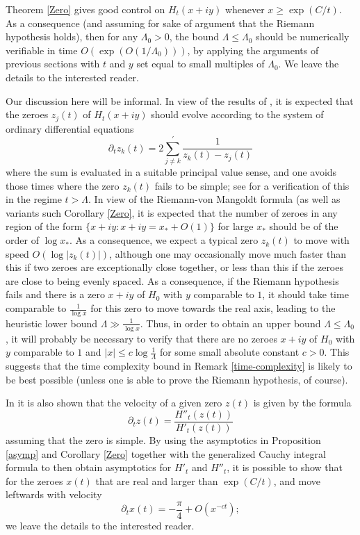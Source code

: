 \begin{remark}\label{time-complexity}  Theorem \ref{Zero} gives good control on $H_t(x+iy)$ whenever $x \geq \exp( C/t )$.  As a consequence (and assuming for sake of argument that the Riemann hypothesis holds), then for any $\Lambda_0 > 0$, the bound $\Lambda \leq \Lambda_0$ should be numerically verifiable in time $O( \exp( O(1/\Lambda_0) ))$, by applying the arguments of previous sections with $t$ and $y$ set equal to small multiples of $\Lambda_0$.  We leave the details to the interested reader.
\end{remark}

\begin{remark} Our discussion here will be informal.  In view of the results of \cite{csv}, it is expected that the zeroes $z_j(t)$ of $H_t(x+iy)$ should evolve according to the system of ordinary differential equations
$$ \partial_t z_k(t) = 2 \sum_{j \neq k}^{\prime} \frac{1}{z_k(t) - z_j(t)}$$
where the sum is evaluated in a suitable principal value sense, and one avoids those times where the zero $z_k(t)$ fails to be simple; see \cite[Lemma 2.4]{csv} for a verification of this in the regime $t > \Lambda$.  In view of the Riemann-von Mangoldt formula (as well as variants such Corollary \ref{Zero}, it is expected that the number of zeroes in any region of the form $\{ x+iy: x+iy = x_* + O(1) \}$ for large $x_*$ should be of the order of $\log x_*$.  As a consequence, we expect a typical zero $z_k(t)$ to move with speed $O( \log |z_k(t)| )$, although one may occasionally move much faster than this if two zeroes are exceptionally close together, or less than this if the zeroes are close to being evenly spaced.  As a consequence, if the Riemann hypothesis fails and there is a zero $x+iy$ of $H_0$ with $y$ comparable to $1$, it should take time comparable to $\frac{1}{\log x}$ for this zero to move towards the real axis, leading to the heuristic lower bound $\Lambda \gg \frac{1}{\log x}$.  Thus, in order to obtain an upper bound $\Lambda \leq \Lambda_0$, it will probably be necessary to verify that there are no zeroes $x+iy$ of $H_0$ with $y$ comparable to $1$ and $|x| \leq c \log \frac{1}{\Lambda}$ for some small absolute constant $c>0$.  This suggests that the time complexity bound in Remark \ref{time-complexity} is likely to be best possible (unless one is able to prove the Riemann hypothesis, of course).

In \cite[Lemma 2.1]{csv} it is also shown that the velocity of a given zero $z(t)$ is given by the formula
$$ \partial_t z(t) = \frac{H''_t(z(t))}{H'_t(z(t))}$$
assuming that the zero is simple.  By using the asymptotics in Proposition \ref{asymp} and Corollary \ref{Zero} together with the generalized Cauchy integral formula to then obtain asymptotics for $H'_t$ and $H''_t$, it is possible to show that for the zeroes $x(t)$ that are real and larger than $\exp(C/t)$, and move leftwards with velocity
$$ \partial_t x(t) = - \frac{\pi}{4} + O( x^{-ct} );$$
we leave the details to the interested reader.  


\end{remark}
